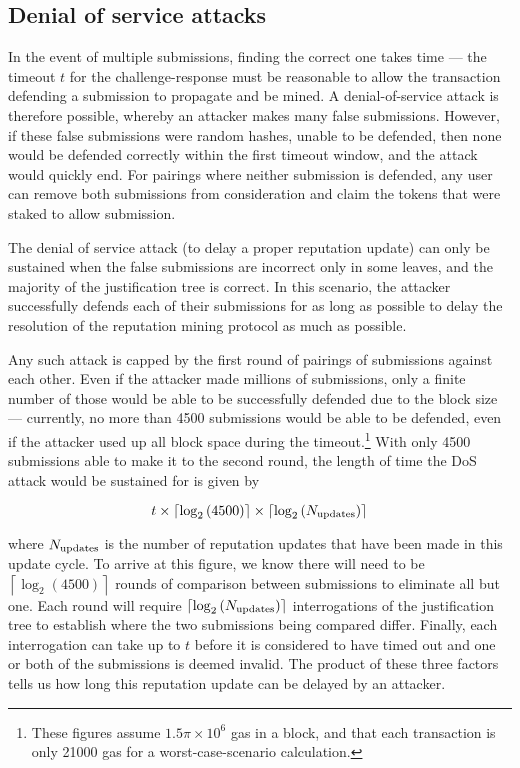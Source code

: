 \subsection{Denial of service attacks}\label{sec:mining-possible-attacks}

In the event of multiple submissions, finding the correct one takes time --- the timeout $t$ for the challenge-response must be reasonable to allow the transaction defending a submission to propagate and be mined. A denial-of-service attack is therefore possible, whereby an attacker makes many false submissions. However, if these false submissions were random hashes, unable to be defended, then none would be defended correctly within the first timeout window, and the attack would quickly end. For pairings where neither submission is defended, any user can remove both submissions from consideration and claim the tokens that were staked to allow submission.

The denial of service attack (to delay a proper reputation update) can only be sustained when the false submissions are incorrect only in some leaves, and the majority of the justification tree is correct. In this scenario, the attacker successfully defends each of their submissions for as long as possible to delay the resolution of the reputation mining protocol as much as possible.

Any such attack is capped by the first round of pairings of submissions against each other. Even if the attacker made millions of submissions, only a finite number of those would be able to be successfully defended due to the block size --- currently, no more than 4500 submissions would be able to be defended, even if the attacker used up all block space during the timeout.\footnote{These figures assume $1.5\pi\times10^6$ gas in a block, and that each transaction is only 21000 gas for a worst-case-scenario calculation.} With only 4500 submissions able to make it to the second round, the length of time the DoS attack would be sustained for is given by

$$t \times \left\lceil\log_2\left(4500\right)\right\rceil\times \left\lceil\log_2\left(N_{\rm updates}\right)\right\rceil$$

\noindent where $N_{\rm updates}$ is the number of reputation updates that have been made in this update cycle. To arrive at this figure, we know there will need to be $\left\lceil\log_2\left(4500\right)\right\rceil$ rounds of comparison between submissions to eliminate all but one. Each round will require $\left\lceil\log_2\left(N_{\rm updates}\right)\right\rceil$ interrogations of the justification tree to establish where the two submissions being compared differ. Finally, each interrogation can take up to $t$ before it is considered to have timed out and one or both of the submissions is deemed invalid. The product of these three factors tells us how long this reputation update can be delayed by an attacker.

